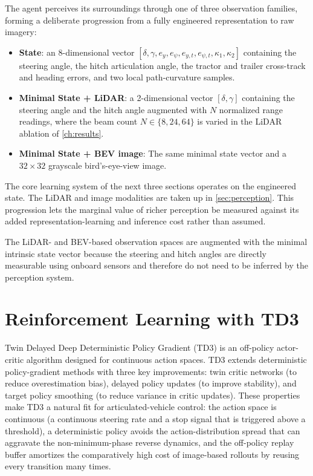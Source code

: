 The agent perceives its surroundings through one of three observation families, forming a deliberate progression from a fully engineered representation to raw imagery:
\begin{itemize}
    \item \textbf{State}: an 8-dimensional vector $[\delta,\gamma,e_y,e_\psi,e_{y,t},e_{\psi,t},\kappa_1,\kappa_2]$ containing the steering angle, the hitch articulation angle, the tractor and trailer cross-track and heading errors, and two local path-curvature samples.
    \item \textbf{Minimal State + LiDAR}: a 2-dimensional vector $[\delta,\gamma]$  containing the steering angle and the hitch angle augmented with $N$ normalized range readings, where the beam count $N \in \{8,24,64\}$ is varied in the LiDAR ablation of \cref{ch:results}.
    \item \textbf{Minimal State + BEV image}: The same minimal state vector and a $32 \times 32$ grayscale bird's-eye-view image.
\end{itemize}
The core learning system of the next three sections operates on the engineered state. The LiDAR and image modalities are taken up in \cref{sec:perception}. This progression lets the marginal value of richer perception be measured against its added representation-learning and inference cost rather than assumed.

The LiDAR- and BEV-based observation spaces are augmented with the minimal intrinsic state vector because the steering and hitch angles are directly measurable using onboard sensors and therefore do not need to be inferred by the perception system. 

\section{Reinforcement Learning with TD3}

Twin Delayed Deep Deterministic Policy Gradient (TD3) is an off-policy actor-critic algorithm designed for continuous action spaces. TD3 extends deterministic policy-gradient methods with three key improvements: twin critic networks (to reduce overestimation bias), delayed policy updates (to improve stability), and target policy smoothing (to reduce variance in critic updates). These properties make TD3 a natural fit for articulated-vehicle control: the action space is continuous (a continuous steering rate and a stop signal that is triggered above a threshold), a deterministic policy avoids the action-distribution spread that can aggravate the non-minimum-phase reverse dynamics, and the off-policy replay buffer amortizes the comparatively high cost of image-based rollouts by reusing every transition many times.

